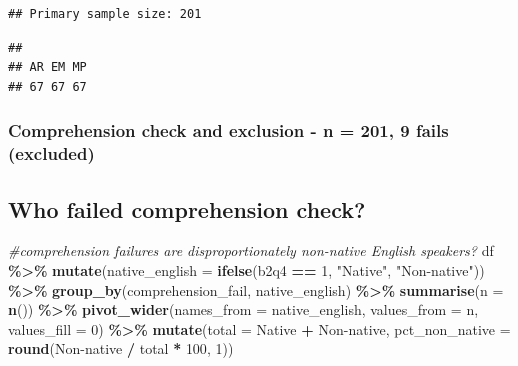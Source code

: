 \documentclass[
]{article}
\newenvironment{Shaded}{\begin{snugshade}}{\end{snugshade}}
\newcommand{\AttributeTok}[1]{\textcolor[rgb]{0.13,0.29,0.53}{#1}}
\newcommand{\CommentTok}[1]{\textcolor[rgb]{0.56,0.35,0.01}{\textit{#1}}}
\newcommand{\DecValTok}[1]{\textcolor[rgb]{0.00,0.00,0.81}{#1}}
\newcommand{\FunctionTok}[1]{\textcolor[rgb]{0.13,0.29,0.53}{\textbf{#1}}}
\newcommand{\NormalTok}[1]{#1}
\newcommand{\SpecialCharTok}[1]{\textcolor[rgb]{0.81,0.36,0.00}{\textbf{#1}}}
\newcommand{\StringTok}[1]{\textcolor[rgb]{0.31,0.60,0.02}{#1}}
\begin{document}
\begin{verbatim}
## Primary sample size: 201
\end{verbatim}

\begin{Shaded}
\end{Shaded}

\begin{verbatim}
## 
## AR EM MP 
## 67 67 67
\end{verbatim}

\subsubsection{Comprehension check and exclusion - n = 201, 9 fails
(excluded)}\label{comprehension-check-and-exclusion---n-201-9-fails-excluded}

\subsection{Who failed comprehension
check?}\label{who-failed-comprehension-check}

\begin{Shaded}
\begin{Highlighting}[]
\CommentTok{\#comprehension failures are disproportionately non{-}native English speakers?}
\NormalTok{df }\SpecialCharTok{\%\textgreater{}\%}
  \FunctionTok{mutate}\NormalTok{(}\AttributeTok{native\_english =} \FunctionTok{ifelse}\NormalTok{(b2q4 }\SpecialCharTok{==} \DecValTok{1}\NormalTok{, }\StringTok{"Native"}\NormalTok{, }\StringTok{"Non{-}native"}\NormalTok{)) }\SpecialCharTok{\%\textgreater{}\%}
  \FunctionTok{group\_by}\NormalTok{(comprehension\_fail, native\_english) }\SpecialCharTok{\%\textgreater{}\%}
  \FunctionTok{summarise}\NormalTok{(}\AttributeTok{n =} \FunctionTok{n}\NormalTok{()) }\SpecialCharTok{\%\textgreater{}\%}
  \FunctionTok{pivot\_wider}\NormalTok{(}\AttributeTok{names\_from =}\NormalTok{ native\_english, }\AttributeTok{values\_from =}\NormalTok{ n, }\AttributeTok{values\_fill =} \DecValTok{0}\NormalTok{) }\SpecialCharTok{\%\textgreater{}\%}
  \FunctionTok{mutate}\NormalTok{(}\AttributeTok{total =}\NormalTok{ Native }\SpecialCharTok{+} \StringTok{\textasciigrave{}}\AttributeTok{Non{-}native}\StringTok{\textasciigrave{}}\NormalTok{,}
         \AttributeTok{pct\_non\_native =} \FunctionTok{round}\NormalTok{(}\StringTok{\textasciigrave{}}\AttributeTok{Non{-}native}\StringTok{\textasciigrave{}} \SpecialCharTok{/}\NormalTok{ total }\SpecialCharTok{*} \DecValTok{100}\NormalTok{, }\DecValTok{1}\NormalTok{))}
\end{Highlighting}
\end{Shaded}
\end{document}
